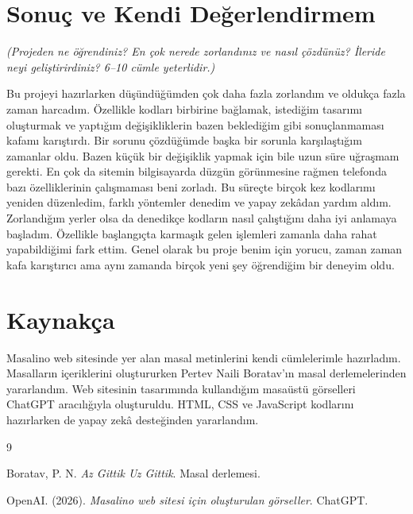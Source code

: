 \documentclass[12pt,a4paper]{article}
\newcommand{\aciklama}[1]{{\color{gray}\itshape (#1)}}
\begin{document}
\section{Sonuç ve Kendi Değerlendirmem}
\aciklama{Projeden ne öğrendiniz? En çok nerede zorlandınız ve nasıl çözdünüz? İleride
neyi geliştirirdiniz? 6--10 cümle yeterlidir.}

Bu projeyi hazırlarken düşündüğümden çok daha fazla zorlandım ve oldukça fazla zaman harcadım. Özellikle kodları birbirine bağlamak, istediğim tasarımı oluşturmak ve yaptığım değişikliklerin bazen beklediğim gibi sonuçlanmaması kafamı karıştırdı. Bir sorunu çözdüğümde başka bir sorunla karşılaştığım zamanlar oldu. Bazen küçük bir değişiklik yapmak için bile uzun süre uğraşmam gerekti. En çok da sitemin bilgisayarda düzgün görünmesine rağmen telefonda bazı özelliklerinin çalışmaması beni zorladı. Bu süreçte birçok kez kodlarımı yeniden düzenledim, farklı yöntemler denedim ve yapay zekâdan yardım aldım. Zorlandığım yerler olsa da denedikçe kodların nasıl çalıştığını daha iyi anlamaya başladım. Özellikle başlangıçta karmaşık gelen işlemleri zamanla daha rahat yapabildiğimi fark ettim. Genel olarak bu proje benim için yorucu, zaman zaman kafa karıştırıcı ama aynı zamanda birçok yeni şey öğrendiğim bir deneyim oldu.

\section{Kaynakça}
Masalino web sitesinde yer alan masal metinlerini kendi cümlelerimle hazırladım. Masalların içeriklerini oluştururken Pertev Naili Boratav'ın masal derlemelerinden yararlandım. Web sitesinin tasarımında kullandığım masaüstü görselleri ChatGPT aracılığıyla oluşturuldu. HTML, CSS ve JavaScript kodlarını hazırlarken de yapay zekâ desteğinden yararlandım.



\begin{thebibliography}{9}

Boratav, P. N. \emph{Az Gittik Uz Gittik}. Masal derlemesi.

OpenAI. (2026). \emph{Masalino web sitesi için oluşturulan görseller}. ChatGPT.

\end{thebibliography}
\end{document}

